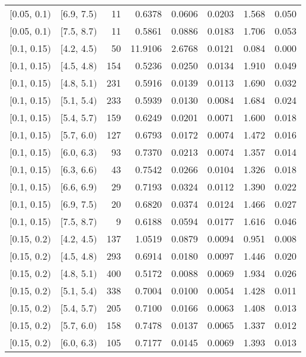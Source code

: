 \begin{longtable}{| l | l | r | r | r | r | r | r |}
        $[$0.05, 0.1$)$ & $[$6.9, 7.5$)$ & 11 & 0.6378 & 0.0606 & 0.0203 & 1.568 & 0.050 \\
        $[$0.05, 0.1$)$ & $[$7.5, 8.7$)$ & 11 & 0.5861 & 0.0886 & 0.0183 & 1.706 & 0.053 \\
        $[$0.1, 0.15$)$ & $[$4.2, 4.5$)$ & 50 & 11.9106 & 2.6768 & 0.0121 & 0.084 & 0.000 \\
        $[$0.1, 0.15$)$ & $[$4.5, 4.8$)$ & 154 & 0.5236 & 0.0250 & 0.0134 & 1.910 & 0.049 \\
        $[$0.1, 0.15$)$ & $[$4.8, 5.1$)$ & 231 & 0.5916 & 0.0139 & 0.0113 & 1.690 & 0.032 \\
        $[$0.1, 0.15$)$ & $[$5.1, 5.4$)$ & 233 & 0.5939 & 0.0130 & 0.0084 & 1.684 & 0.024 \\
        $[$0.1, 0.15$)$ & $[$5.4, 5.7$)$ & 159 & 0.6249 & 0.0201 & 0.0071 & 1.600 & 0.018 \\
        $[$0.1, 0.15$)$ & $[$5.7, 6.0$)$ & 127 & 0.6793 & 0.0172 & 0.0074 & 1.472 & 0.016 \\
        $[$0.1, 0.15$)$ & $[$6.0, 6.3$)$ & 93 & 0.7370 & 0.0213 & 0.0074 & 1.357 & 0.014 \\
        $[$0.1, 0.15$)$ & $[$6.3, 6.6$)$ & 43 & 0.7542 & 0.0266 & 0.0104 & 1.326 & 0.018 \\
        $[$0.1, 0.15$)$ & $[$6.6, 6.9$)$ & 29 & 0.7193 & 0.0324 & 0.0112 & 1.390 & 0.022 \\
        $[$0.1, 0.15$)$ & $[$6.9, 7.5$)$ & 20 & 0.6820 & 0.0374 & 0.0124 & 1.466 & 0.027 \\
        $[$0.1, 0.15$)$ & $[$7.5, 8.7$)$ & 9 & 0.6188 & 0.0594 & 0.0177 & 1.616 & 0.046 \\
        $[$0.15, 0.2$)$ & $[$4.2, 4.5$)$ & 137 & 1.0519 & 0.0879 & 0.0094 & 0.951 & 0.008 \\
        $[$0.15, 0.2$)$ & $[$4.5, 4.8$)$ & 293 & 0.6914 & 0.0180 & 0.0097 & 1.446 & 0.020 \\
        $[$0.15, 0.2$)$ & $[$4.8, 5.1$)$ & 400 & 0.5172 & 0.0088 & 0.0069 & 1.934 & 0.026 \\
        $[$0.15, 0.2$)$ & $[$5.1, 5.4$)$ & 338 & 0.7004 & 0.0100 & 0.0054 & 1.428 & 0.011 \\
        $[$0.15, 0.2$)$ & $[$5.4, 5.7$)$ & 205 & 0.7100 & 0.0166 & 0.0063 & 1.408 & 0.013 \\
        $[$0.15, 0.2$)$ & $[$5.7, 6.0$)$ & 158 & 0.7478 & 0.0137 & 0.0065 & 1.337 & 0.012 \\
        $[$0.15, 0.2$)$ & $[$6.0, 6.3$)$ & 105 & 0.7177 & 0.0145 & 0.0069 & 1.393 & 0.013 \\

\end{longtable}
